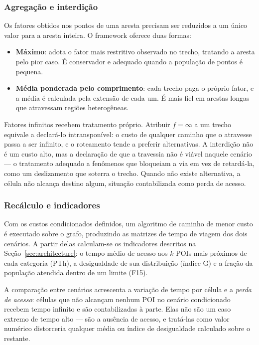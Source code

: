 \subsubsection{Agregação e interdição}

Os fatores obtidos nos pontos de uma aresta precisam ser reduzidos a um único
valor para a aresta inteira. O framework oferece duas formas:

\begin{itemize}
  \item \textbf{Máximo}: adota o fator mais restritivo observado no trecho,
    tratando a aresta pelo pior caso. É conservador e adequado quando a
    população de pontos é pequena.
  \item \textbf{Média ponderada pelo comprimento}: cada trecho paga o próprio
    fator, e a média é calculada pela extensão de cada um. É mais fiel em
    arestas longas que atravessam regiões heterogêneas.
\end{itemize}

Fatores infinitos recebem tratamento próprio. Atribuir $f = \infty$ a um trecho equivale a declará-lo intransponível: o custo de qualquer caminho que o atravesse passa a ser infinito, e o roteamento tende a preferir alternativas. A interdição não é um custo alto, mas a declaração de que a travessia não é viável naquele cenário — o tratamento adequado a fenômenos que bloqueiam a via em vez de retardá-la, como um deslizamento que soterra o trecho. Quando não existe alternativa, a célula não alcança destino algum, situação contabilizada como perda de acesso.

\subsubsection{Recálculo e indicadores}

Com os custos condicionados definidos, um algoritmo de caminho de menor custo é
executado sobre o grafo, produzindo as matrizes de tempo de viagem dos dois
cenários. A partir delas calculam-se os indicadores descritos na
Seção~\ref{sec:architecture}: o tempo médio de acesso aos $k$ POIs mais próximos
de cada categoria (PTh), a desigualdade de sua distribuição (índice G) e a fração
da população atendida dentro de um limite (F15).

A comparação entre cenários acrescenta a variação de tempo por célula e a
\emph{perda de acesso}: células que não alcançam nenhum POI no cenário
condicionado recebem tempo infinito e são contabilizadas à parte. Elas não são um
caso extremo de tempo alto — são a ausência de acesso, e tratá-las como valor
numérico distorceria qualquer média ou índice de desigualdade calculado sobre o
restante.
